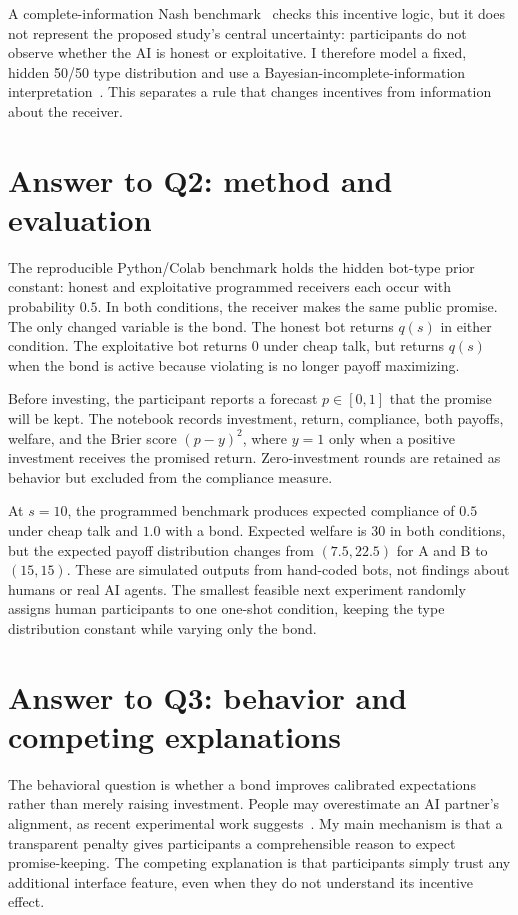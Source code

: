 A complete-information Nash benchmark~\cite{nash1950} checks this incentive logic, but it does not represent the proposed study's central uncertainty: participants do not observe whether the AI is honest or exploitative. I therefore model a fixed, hidden 50/50 type distribution and use a Bayesian-incomplete-information interpretation~\cite{harsanyi1968}. This separates a rule that changes incentives from information about the receiver.

\section{Answer to Q2: method and evaluation}

The reproducible Python/Colab benchmark holds the hidden bot-type prior constant: honest and exploitative programmed receivers each occur with probability $0.5$. In both conditions, the receiver makes the same public promise. The only changed variable is the bond. The honest bot returns $q(s)$ in either condition. The exploitative bot returns $0$ under cheap talk, but returns $q(s)$ when the bond is active because violating is no longer payoff maximizing.

Before investing, the participant reports a forecast $p\in[0,1]$ that the promise will be kept. The notebook records investment, return, compliance, both payoffs, welfare, and the Brier score $(p-y)^2$, where $y=1$ only when a positive investment receives the promised return. Zero-investment rounds are retained as behavior but excluded from the compliance measure.

At $s=10$, the programmed benchmark produces expected compliance of $0.5$ under cheap talk and $1.0$ with a bond. Expected welfare is 30 in both conditions, but the expected payoff distribution changes from $(7.5,22.5)$ for A and B to $(15,15)$. These are simulated outputs from hand-coded bots, not findings about humans or real AI agents. The smallest feasible next experiment randomly assigns human participants to one one-shot condition, keeping the type distribution constant while varying only the bond.


\balance

\section{Answer to Q3: behavior and competing explanations}

The behavioral question is whether a bond improves calibrated expectations rather than merely raising investment. People may overestimate an AI partner's alignment, as recent experimental work suggests~\cite{he2025}. My main mechanism is that a transparent penalty gives participants a comprehensible reason to expect promise-keeping. The competing explanation is that participants simply trust any additional interface feature, even when they do not understand its incentive effect.

